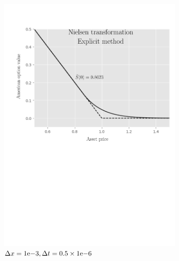 \begin{figure}[tbp]
\begin{subfigure}{0.4\textwidth}
    \includegraphics[width=\textwidth]{chapters/chapter3/TestCase2NielsenExplicit.pdf}
    \caption{$\Delta{x}={1}\mathrm{e}{-3}, \Delta{t}=0.5\times{1}\mathrm{e}{-6}$}
    \label{fig:finitedifferencesschemes:numericaresults:test_case_2_explicit_nielsen}
  \end{subfigure}
  \hspace{0.5cm}
  \begin{subfigure}{0.4\textwidth}
    \label{fig:finitedifferencesschemes:numericaresults:test_case_2_implicit_nielsen}
    \centering

\end{subfigure}
\end{figure}
